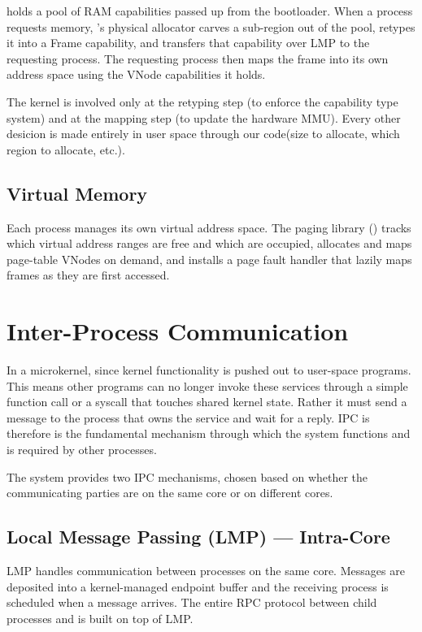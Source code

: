  holds a pool of RAM capabilities passed up from the bootloader.
When a process requests memory, 's physical allocator carves a
sub-region out of the pool, retypes it into a Frame capability, and transfers
that capability over LMP to the requesting process.  The requesting process then
maps the frame into its own address space using the VNode capabilities it holds.

\medskip\noindent
The kernel is involved only at the retyping step (to enforce the capability type
system) and at the mapping step (to update the hardware MMU). Every other desicion is
made entirely in user space through our code(size to allocate, which region to allocate, etc.).

\subsection{Virtual Memory}

Each process manages its own virtual address space.  The paging library
() tracks which virtual address ranges are free and which
are occupied, allocates and maps page-table VNodes on demand, and installs a
page fault handler that lazily maps frames as they are first accessed.

\section{Inter-Process Communication}

In a microkernel, since kernel functionality is pushed out to user-space programs.
This means other programs can no longer invoke these services through a 
simple function call or a syscall that touches shared kernel state. Rather it must
send a message to the process that owns the service and wait for a reply. 
IPC is therefore is the fundamental mechanism through which the system functions
and is required by other processes.

\medskip\noindent
The system provides two IPC mechanisms, chosen based on whether the
communicating parties are on the same core or on different cores.

\subsection{Local Message Passing (LMP) --- Intra-Core}

LMP handles communication between processes on the same core. Messages are
deposited into a kernel-managed endpoint buffer and the receiving process is
scheduled when a message arrives. The entire RPC protocol between child
processes and  is built on top of LMP.

